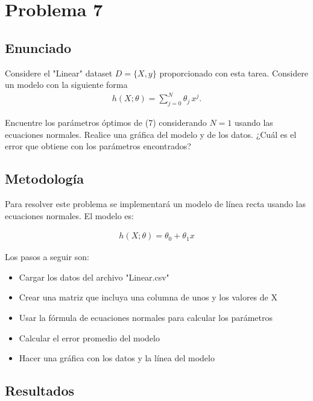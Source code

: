 \documentclass{article}
\begin{document}
\section{Problema 7}

\subsection{Enunciado}

Considere el "Linear" dataset $D=\{X, y\}$ proporcionado con esta tarea. Considere un modelo con la siguiente forma
\begin{align} \tag{7}
h(X;\theta) = \sum_{j=0}^{N} \theta_j\, x^j.
\end{align}

Encuentre los parámetros óptimos de (7) considerando $N=1$ usando las ecuaciones normales. Realice una gráfica del modelo y de los datos. ¿Cuál es el error que obtiene con los parámetros encontrados?

\subsection{Metodología}

Para resolver este problema se implementará un modelo de línea recta usando las ecuaciones normales. El modelo es:

\begin{align}
h(X;\theta) = \theta_0 + \theta_1 x
\end{align}

Los pasos a seguir son:
\begin{itemize}
    \item Cargar los datos del archivo "Linear.csv"
    \item Crear una matriz que incluya una columna de unos y los valores de X
    \item Usar la fórmula de ecuaciones normales para calcular los parámetros
    \item Calcular el error promedio del modelo
    \item Hacer una gráfica con los datos y la línea del modelo
\end{itemize}

\subsection{Resultados}
\setcounter{equation}{0}
\end{document}
